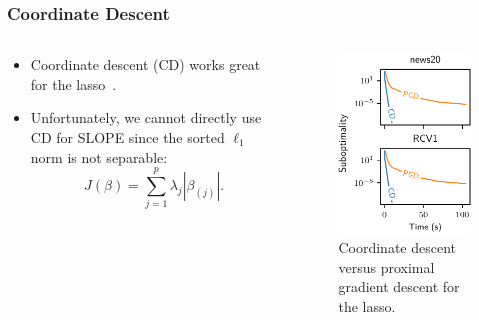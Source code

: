 \begin{frame}
  \frametitle{Coordinate Descent}

  \begin{columns}[c]
    \begin{column}{0.45\textwidth}

      \begin{itemize}
        \item<1-> Coordinate descent (CD) works great for the lasso~\parencite{friedman2010}.
        \item<2->
              Unfortunately, we cannot directly use CD for SLOPE since the
              sorted \(\ell_1\) norm is \alert{not separable}:
              \[
                J(\beta) = \sum_{j=1}^p \lambda_j |\beta_{(j)}|.
              \]
      \end{itemize}

      \medskip

    \end{column}
    \begin{column}{0.45\textwidth}
      \begin{figure}[htpb]
        \centering
        \includegraphics[]{figures/cd-vs-pgd.pdf}
        \caption{%
          Coordinate descent versus proximal gradient descent for the lasso.
        }
        \label{fig:cd-vs-pgd}
      \end{figure}
    \end{column}
  \end{columns}

\end{frame}

